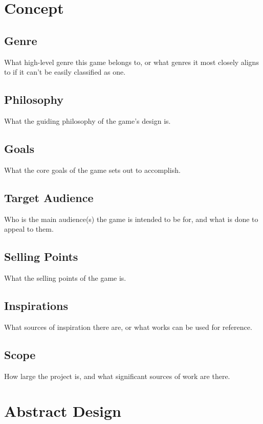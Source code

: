 

\newcommand{\gddTitle}{Game Name}
\newcommand{\gddSubtitle}{Game Subtitle}
\newcommand{\gddCompany}{Company Name}
\newcommand{\gddAuthors}{Firstname Lastname, Firstname Lastname, Firstname Lastname}
\newcommand{\gddDate}{January 1st, 1960}
\newcommand{\gddVersion}{1.0.0}



\gddTitlepage

\section{Concept}
\subsection{Genre}
What high-level genre this game belongs to, or what genres it most closely aligns to if it can't be easily classified as one.
\subsection{Philosophy}
What the guiding philosophy of the game's design is.
\subsection{Goals}
What the core goals of the game sets out to accomplish.
\subsection{Target Audience}
Who is the main audience(s) the game is intended to be for, and what is done to appeal to them.
\subsection{Selling Points}
What the selling points of the game is.
\subsection{Inspirations}
What sources of inspiration there are, or what works can be used for reference.
\subsection{Scope}
How large the project is, and what significant sources of work are there.

\section{Abstract Design}
